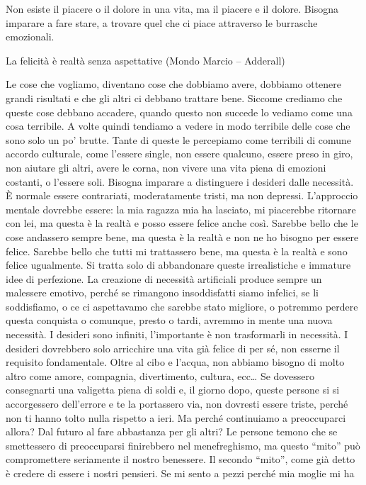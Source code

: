 \documentclass[12pt]{book} %
\begin{document}
Non esiste il piacere o il dolore in una vita, ma il piacere e il dolore. Bisogna imparare a fare stare, a trovare quel
che ci piace attraverso le burrasche emozionali.

La felicità è realtà senza aspettative (Mondo Marcio – Adderall)

Le cose che vogliamo, diventano cose che dobbiamo avere, dobbiamo ottenere grandi risultati e che gli altri ci debbano
trattare bene. Siccome crediamo che queste cose debbano accadere, quando questo non succede lo vediamo come una cosa
terribile. A volte quindi tendiamo a vedere in modo terribile delle cose che sono solo un po'
brutte. Tante di queste le percepiamo come terribili di comune accordo culturale, come l'essere
single, non essere qualcuno, essere preso in giro, non aiutare gli altri, avere le corna, non vivere una vita piena di
emozioni costanti, o l'essere soli. Bisogna imparare a distinguere i desideri dalle necessità. È
normale essere contrariati, moderatamente tristi, ma non depressi. L'approccio mentale dovrebbe
essere: la mia ragazza mia ha lasciato, mi piacerebbe ritornare con lei, ma questa è la realtà e posso essere felice
anche così. Sarebbe bello che le cose andassero sempre bene, ma questa è la realtà e non ne ho bisogno per essere
felice. Sarebbe bello che tutti mi trattassero bene, ma questa è la realtà e sono felice ugualmente. Si tratta solo di
abbandonare queste irrealistiche e immature idee di perfezione. La creazione di necessità artificiali produce sempre un
malessere emotivo, perché se rimangono insoddisfatti siamo infelici, se li soddisfiamo, o ce ci aspettavamo che sarebbe
stato migliore, o potremmo perdere questa conquista o comunque, presto o tardi, avremmo in mente una nuova necessità. I
desideri sono infiniti, l'importante è non trasformarli in necessità. I desideri dovrebbero solo
arricchire una vita già felice di per sé, non esserne il requisito fondamentale. Oltre al cibo e
l'acqua, non abbiamo bisogno di molto altro come amore, compagnia, divertimento, cultura, ecc… Se
dovessero consegnarti una valigetta piena di soldi e, il giorno dopo, queste persone si si accorgessero dell'errore e
te la portassero via, non dovresti essere triste, perché non ti hanno tolto nulla rispetto a ieri. Ma perché
continuiamo a preoccuparci allora? Dal futuro al fare abbastanza per gli altri? Le persone temono che se smettessero di
preoccuparsi finirebbero nel menefreghismo, ma questo “mito” può compromettere seriamente il nostro benessere. Il
secondo “mito”, come già detto è credere di essere i nostri pensieri. Se mi sento a pezzi perché mia moglie mi ha
\end{document}

